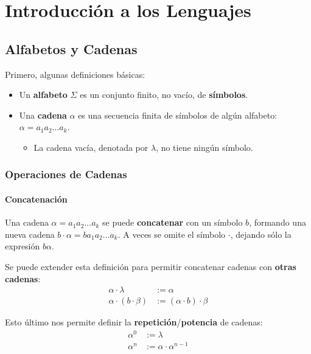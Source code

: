 \chapter{Introducción a los Lenguajes}

\section{Alfabetos y Cadenas}

Primero, algunas definiciones básicas:

\begin{itemize}
    \item Un \textbf{alfabeto} $\Sigma$ es un conjunto finito, no vacío, de \textbf{símbolos}.
    \item Una \textbf{cadena} $\alpha$ es una secuencia finita de símbolos de algún alfabeto: $\alpha = a_1 a_2 ... a_k$.
    \begin{itemize}
        \item La cadena vacía, denotada por $\lambda$, no tiene ningún símbolo.
    \end{itemize}
\end{itemize}

\subsection{Operaciones de Cadenas}

\subsubsection{Concatenación}

Una cadena $\alpha = a_1 a_2 ... a_k$ se puede \textbf{concatenar} con un símbolo $b$, formando una nueva cadena $b \cdot \alpha = b a_1 a_2 ... a_k$. A veces se omite el símbolo $\cdot$, dejando sólo la expresión $b \alpha$.

Se puede extender esta definición para permitir concatenar cadenas con \textbf{otras cadenas}:
$$
\begin{aligned}
    \alpha \cdot \lambda & := \alpha \\
    \alpha \cdot (b \cdot \beta) & := (\alpha \cdot b) \cdot \beta
\end{aligned}
$$

Esto último nos permite definir la \textbf{repetición}/\textbf{potencia} de cadenas:
$$
\begin{aligned}
    \alpha^0 & := \lambda \\
    \alpha^n & := \alpha \cdot \alpha^{n-1}
\end{aligned}
$$

